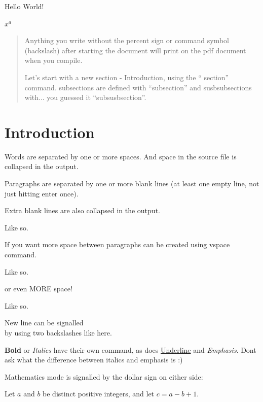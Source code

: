 \documentclass{article}
\begin{document}
Hello World!

$x^{a}$

\textbeta

\begin{abstract}

Anything you write without the percent sign or command symbol (backslash) after starting the document will print on the pdf document when you compile.

Let's start with a new section - Introduction, using the `` section'' command. subsections are defined with ``subsection'' and susbsubsections with... you guessed it ``subsusbsection''.
\end{abstract}

\section{Introduction}
Words are separated by one or more
spaces. And space in the source file is collapsed   
in        the output.

Paragraphs are separated by one
or more blank lines (at least one empty line, not just hitting enter once).




Extra blank lines are also collapsed in the output. 




Like so.

If you want more space between paragraphs can be created using vspace command.

\vspace{2cm}

Like so.

or even MORE space!

\vspace{5cm}

Like so.


New line can be signalled\\ by using two backslashes like here.

\vspace{1cm}

\textbf{Bold} or \textit{Italics} have their own command, as does \underline{Underline}  and \emph{Emphasis}. Dont ask what the difference between italics and emphasis is :)

\vspace{1cm}

Mathematics mode is signalled by the dollar sign on either side: 

Let $a$ and $b$ be distinct positive
integers, and let $c = a - b + 1$.
\end{document}
